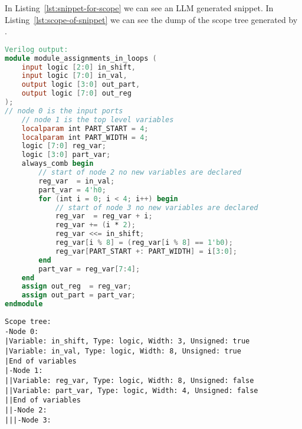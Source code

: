 In Listing~\ref{lst:snippet-for-scope} we can see an LLM generated snippet.
In Listing~\ref{lst:scope-of-snippet} we can see the dump of the scope tree generated by \ourname.

\begin{lstlisting}[language=verilog,caption={LLM generated snippet},label={lst:snippet-for-scope},breaklines=true]
Verilog output:
module module_assignments_in_loops (
    input logic [2:0] in_shift,
    input logic [7:0] in_val,
    output logic [3:0] out_part,
    output logic [7:0] out_reg
);
// node 0 is the input ports
    // node 1 is the top level variables
    localparam int PART_START = 4;
    localparam int PART_WIDTH = 4;
    logic [7:0] reg_var;
    logic [3:0] part_var;
    always_comb begin
        // start of node 2 no new variables are declared
        reg_var  = in_val;
        part_var = 4'h0;
        for (int i = 0; i < 4; i++) begin
            // start of node 3 no new variables are declared
            reg_var  = reg_var + i;
            reg_var += (i * 2);
            reg_var <<= in_shift;
            reg_var[i % 8] = (reg_var[i % 8] == 1'b0);
            reg_var[PART_START +: PART_WIDTH] = i[3:0];
        end
        part_var = reg_var[7:4];
    end
    assign out_reg  = reg_var;
    assign out_part = part_var;
endmodule
\end{lstlisting}

\begin{lstlisting}[caption={Scope tree},label={lst:scope-of-snippet},breaklines=true]
Scope tree:
-Node 0:
|Variable: in_shift, Type: logic, Width: 3, Unsigned: true
|Variable: in_val, Type: logic, Width: 8, Unsigned: true
|End of variables
|-Node 1:
||Variable: reg_var, Type: logic, Width: 8, Unsigned: false
||Variable: part_var, Type: logic, Width: 4, Unsigned: false
||End of variables
||-Node 2:
|||-Node 3: 
\end{lstlisting}
